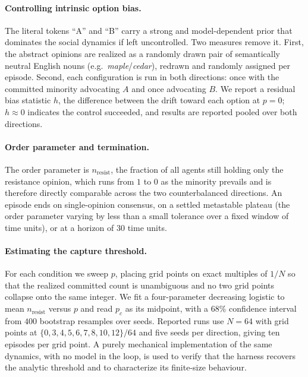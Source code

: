 \documentclass[manuscript,screen,review]{acmart}
\begin{document}
{\paragraph{Controlling intrinsic option bias.} The literal tokens ``A'' and ``B''
carry a strong and model-dependent prior that dominates the social dynamics if
left uncontrolled. Two measures remove it. First, the abstract opinions are
realized as a randomly drawn pair of semantically neutral English nouns
(e.g.\ \emph{maple}/\emph{cedar}), redrawn and randomly assigned per episode.
Second, each configuration is run in both directions: once with the committed
minority advocating $A$ and once advocating $B$. We report a residual bias
statistic $h$, the difference between the drift toward each option at $p=0$;
$h \approx 0$ indicates the control succeeded, and results are reported pooled
over both directions.

\paragraph{Order parameter and termination.} The order parameter is
$n_{\mathrm{resist}}$, the fraction of all agents still holding only the
resistance opinion, which runs from $1$ to $0$ as the minority prevails and is
therefore directly comparable across the two counterbalanced directions. An
episode ends on single-opinion consensus, on a settled metastable plateau (the
order parameter varying by less than a small tolerance over a fixed window of
time units), or at a horizon of $30$ time units.

\paragraph{Estimating the capture threshold.} For each condition we sweep $p$,
placing grid points on exact multiples of $1/N$ so that the realized committed
count is unambiguous and no two grid points collapse onto the same integer. We
fit a four-parameter decreasing logistic to mean $n_{\mathrm{resist}}$ versus
$p$ and read $p_c$ as its midpoint, with a $68\%$ confidence interval from $400$
bootstrap resamples over seeds. Reported runs use $N=64$ with grid points at
$\{0,3,4,5,6,7,8,10,12\}/64$ and five seeds per direction, giving ten episodes per
grid point. A purely mechanical implementation of the same dynamics, with no
model in the loop, is used to verify that the harness recovers the analytic
threshold and to characterize its finite-size behaviour.

}
\end{document}
